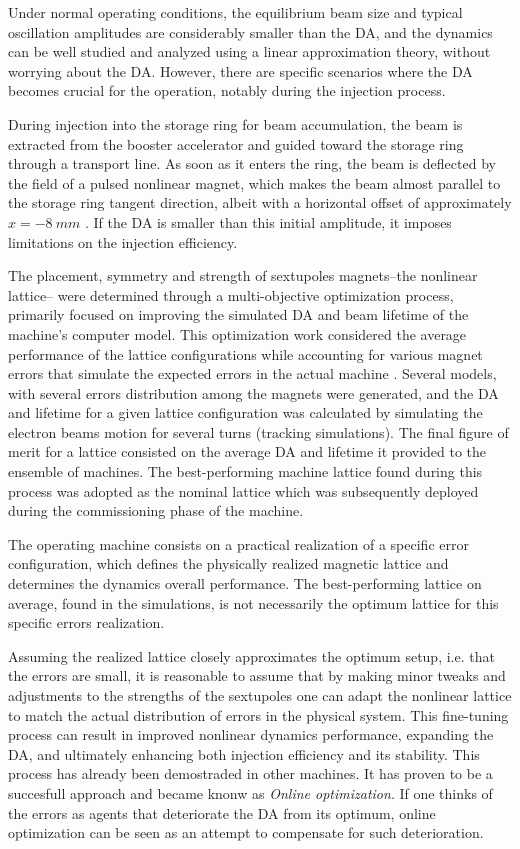 Under normal operating conditions, the equilibrium beam size and typical oscillation amplitudes are considerably smaller than the DA, and the dynamics can be well studied and analyzed using a linear approximation theory, without worrying about the DA. However, there are specific scenarios where the DA becomes crucial for the operation, notably during the injection process.

During injection into the storage ring for beam accumulation, the beam is extracted from the booster accelerator and guided toward the storage ring through a transport line. As soon as it enters the ring, the beam is deflected by the field of a pulsed nonlinear magnet, which makes the beam almost parallel to the storage ring tangent direction, albeit with a horizontal offset of approximately $x=-8~\unit{mm}$ \cite{liu_injection_2016}. If the DA is smaller than this initial amplitude, it imposes limitations on the injection efficiency.

The placement, symmetry and strength of sextupoles magnets--the nonlinear lattice-- were determined through a multi-objective optimization process, primarily focused on improving the simulated DA and beam lifetime of the machine's computer model\cite{de_sa_optimization_2016, dester_energy_2017}. This optimization work considered the average performance of the lattice configurations while accounting for various magnet errors that simulate the expected errors in the actual machine \cite{de_sa_optimization_2016}. Several models, with several errors distribution among the magnets were generated, and the DA and lifetime for a given lattice configuration was calculated by simulating the electron beams motion for several turns (tracking simulations). The final figure of merit for a lattice consisted on the average DA and lifetime it provided to the ensemble of machines. The best-performing machine lattice found during this process was adopted as the nominal lattice which was subsequently deployed during the commissioning phase of the machine.

The operating machine consists on a practical realization of a specific error configuration, which defines the physically realized magnetic lattice and determines the dynamics overall performance. The best-performing lattice on average, found in the simulations, is not necessarily the optimum lattice for this specific errors realization.

Assuming the realized lattice closely approximates the optimum setup, i.e. that the errors are small, it is reasonable to assume that by making minor tweaks and adjustments to the strengths of the sextupoles one can adapt the nonlinear lattice to match the actual distribution of errors in the physical system. This fine-tuning process can result in improved nonlinear dynamics performance, expanding the DA, and ultimately enhancing both injection efficiency and its stability. This process has already been demostraded in other machines. It has proven to be a succesfull approach and became knonw as \textit{Online optimization}. If one thinks of the errors as agents that deteriorate the DA from its optimum, online optimization can be seen as an attempt to compensate for such deterioration.

